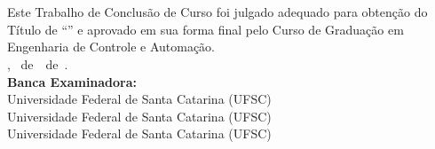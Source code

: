 \imprimircapa


\imprimirfolhaderosto*

\begin{fichacatalografica}
	
\end{fichacatalografica}

\begin{folhadeaprovacao}
	\OnehalfSpacing
	\centering
	\imprimirautor\\%
	\vspace{24pt}		
	\textbf{\imprimirtitulo}%
	\ifnotempty{\imprimirsubtitulo}{:~\imprimirsubtitulo}\\%
	\vspace*{\baselineskip}
	Este Trabalho de Conclusão de Curso foi julgado adequado para obtenção do Título de ``\imprimirformacao'' e aprovado em sua forma final pelo Curso de Graduação em Engenharia de Controle e Automação.\\
	\vspace{12pt}
	\imprimirlocal, \imprimirdia~de~\imprimirmes~de~\imprimirano.\\
	
	\vspace*{18pt}
	\textbf{Banca Examinadora:}\\
	
	\vspace*{24pt}
	\assinatura{\OnehalfSpacing \imprimirbancaa}
	\vspace{6pt}
	Universidade Federal de Santa Catarina (UFSC)\\
	
	\vspace*{24pt}
	\assinatura{\OnehalfSpacing \imprimirbancab}
	\vspace{6pt}
	Universidade Federal de Santa Catarina (UFSC)\\
	
	\vspace*{24pt}
	\assinatura{\OnehalfSpacing \imprimirbancac}
	\vspace{6pt}
	Universidade Federal de Santa Catarina (UFSC)\\
	
\end{folhadeaprovacao}

